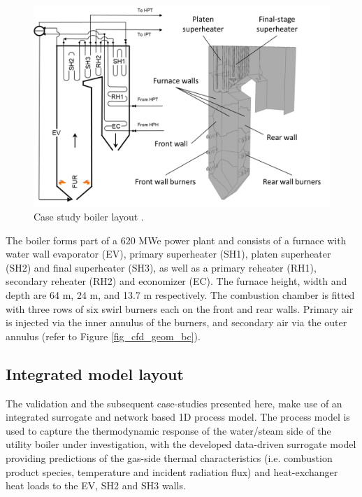 \documentclass[a4paper,fleqn]{cas-dc}
\begin{document}
\begin{figure}[h!]
	\centering
		\includegraphics[scale=0.5]{CASE_STUDY_BOILER}
	  \caption{Case study boiler layout \citep{Rousseau2020}.}\label{fig_case_layout}
\end{figure}

The boiler forms part of a 620 MWe power plant and consists of a furnace with water wall evaporator (EV), primary superheater (SH1), platen superheater (SH2) and final superheater (SH3), as well as a primary reheater (RH1), secondary reheater (RH2) and economizer (EC).  The furnace height, width and depth are 64 m, 24 m, and 13.7 m respectively.  The combustion chamber is fitted with three rows of six swirl burners each on the front and rear walls.  Primary air is injected via the inner annulus of the burners, and secondary air via the outer annulus (refer to Figure \ref{fig_cfd_geom_bc}).

\subsection{Integrated model layout}

The validation and the subsequent case-studies presented here, make use of an integrated surrogate and network based 1D process model. The process model is used to capture the thermodynamic response of the water/steam side of the utility boiler under investigation, with the developed data-driven surrogate model providing predictions of the gas-side thermal characteristics (i.e. combustion product species, temperature and incident radiation flux) and heat-exchanger heat loads to the EV, SH2 and SH3 walls.\\
\end{document}
